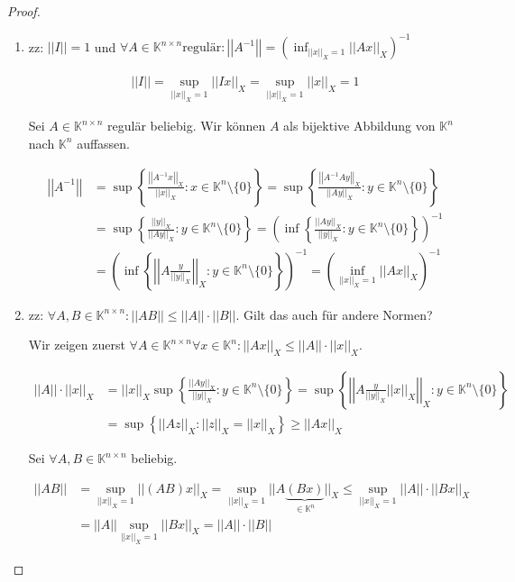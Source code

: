 \documentclass[]{article}
\newcommand{\norm}[1]{\left|\left|#1\right|\right|}
\newcommand{\normx}[1]{\norm{#1}_X}
\newcommand{\supo}{\sup_{\normx{x}=1}}
\begin{document}
\begin{proof}
\begin{enumerate}[label=\alph*)]
		\item zz: $\norm{I} = 1$ und $\forall A \in \mathbb{K}^{n\times n} \text{regulär}: \norm{A^{-1}}=\left(\inf_{\normx{x}=1}\normx{Ax}\right)^{-1}$
		
		\begin{align*}
			\norm{I}=\supo\normx{Ix}=\supo\normx{x}=1
		\end{align*}
	
		Sei $A \in \mathbb{K}^{n\times n}$ regulär beliebig. Wir können $A$ als bijektive Abbildung von $\mathbb{K}^n$ nach $\mathbb{K}^n$ auffassen.
		
		\begin{align*}
			\norm{A^{-1}} &= \sup\left\{\frac{\normx{A^{-1}x}}{\normx{x}}:x\in\mathbb{K}^n\setminus\{0\}\right\} = \sup\left\{\frac{\normx{A^{-1}Ay}}{\normx{Ay}}:y\in\mathbb{K}^n\setminus\{0\}\right\} \\
			&= \sup\left\{\frac{\normx{y}}{\normx{Ay}}:y\in\mathbb{K}^n\setminus\{0\}\right\} = \left(\inf\left\{\frac{\normx{Ay}}{\normx{y}}:y\in\mathbb{K}^n\setminus\{0\}\right\}\right)^{-1} \\
			&= \left(\inf\left\{\normx{A\frac{y}{\normx{y}}}:y\in\mathbb{K}^n\setminus\{0\}\right\}\right)^{-1} = \left(\inf_{\normx{x}=1}\normx{Ax}\right)^{-1}
		\end{align*}
	
		\item zz: $\forall A,B \in \mathbb{K}^{n\times n}: \norm{AB}\leq \norm{A}\cdot\norm{B}$. Gilt das auch für andere Normen?
		
		Wir zeigen zuerst $\forall A \in \mathbb{K}^{n\times n} \forall x \in \mathbb{K}^n: \normx{Ax} \leq \norm{A} \cdot \normx{x}$.
		
		\begin{align*}
			\norm{A}\cdot\normx{x} &= \normx{x} \sup\left\{\frac{\normx{Ay}}{\normx{y}}:y\in\mathbb{K}^n\setminus\{0\}\right\} = \sup\left\{\normx{A\frac{y}{\normx{y}}\normx{x}}:y\in\mathbb{K}^n\setminus\{0\}\right\} \\
			&= \sup\left\{\normx{Az}:\normx{z}=\normx{x}\right\} \geq \normx{Ax}
		\end{align*}
		
		Sei $\forall A,B \in \mathbb{K}^{n\times n}$ beliebig.
		
		\begin{align*}
			\norm{AB}&=\supo\normx{(AB)x}=\supo||A\underbrace{(Bx)}_{\in\mathbb{K}^n}||_X \leq \supo\norm{A}\cdot\normx{Bx} \\
			&= \norm{A}\supo\normx{Bx}=\norm{A}\cdot\norm{B}
		\end{align*}
	

\end{enumerate}
\end{proof}
\end{document}

